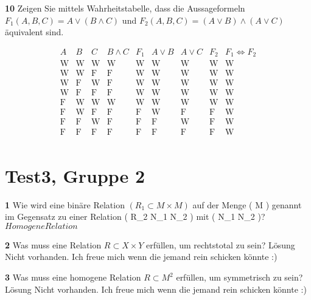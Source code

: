 \documentclass[11pt]{article}
\begin{document}
\textbf{10} Zeigen Sie mittels Wahrheitstabelle, dass die Aussageformeln \(F_1(A,B,C) = A \lor (B \land C)\) und \(F_2(A,B,C) = (A \lor B) \land (A \lor C)\) äquivalent sind.

\[
    \begin{array}{ccc|c|c|c|c|c|c|c}
        A & B & C & B \land C & F_1 & A \lor B & A \lor C & F_2 & F_1 \Leftrightarrow F_2 \\
        \hline
        \text{W} & \text{W} & \text{W} & \text{W} & \text{W} & \text{W} & \text{W} & \text{W} & \text{W} \\
        \text{W} & \text{W} & \text{F} & \text{F} & \text{W} & \text{W} & \text{W} & \text{W} & \text{W} \\
        \text{W} & \text{F} & \text{W} & \text{F} & \text{W} & \text{W} & \text{W} & \text{W} & \text{W} \\
        \text{W} & \text{F} & \text{F} & \text{F} & \text{W} & \text{W} & \text{W} & \text{W} & \text{W} \\
        \text{F} & \text{W} & \text{W} & \text{W} & \text{W} & \text{W} & \text{W} & \text{W} & \text{W} \\
        \text{F} & \text{W} & \text{F} & \text{F} & \text{F} & \text{W} & \text{F} & \text{F} & \text{W} \\
        \text{F} & \text{F} & \text{W} & \text{F} & \text{F} & \text{F} & \text{W} & \text{F} & \text{W} \\
        \text{F} & \text{F} & \text{F} & \text{F} & \text{F} & \text{F} & \text{F} & \text{F} & \text{W} \\
    \end{array}
\]

\section{Test3, Gruppe 2}
    \textbf{1} Wie wird eine binäre Relation $( R_1 \subset M \times M )$ auf der Menge ( M ) genannt im Gegensatz zu einer Relation ( R_2 \subset N_1 \times N_2 ) mit ( N_1 \neq N_2 )?\newline
    $Homogene Relation$\newline

    \textbf{2} Was muss eine Relation \( R \subset X \times Y \) erfüllen, um rechtstotal zu sein?\newline
    Lösung Nicht vorhanden. Ich freue mich wenn die jemand rein schicken könnte :)\newline

    \textbf{3} Was muss eine homogene Relation \( R \subset M^2 \) erfüllen, um symmetrisch zu sein?\newline
    Lösung Nicht vorhanden. Ich freue mich wenn die jemand rein schicken könnte :)\newline
\end{document}
